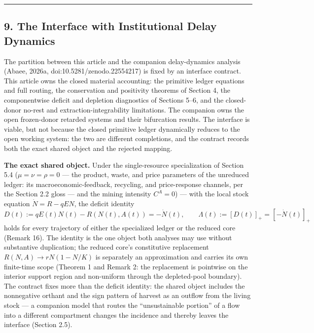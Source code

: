 \documentclass[11pt]{article}
\begin{document}
\begin{center}\rule{0.5\linewidth}{0.5pt}\end{center}

\subsection{9. The Interface with Institutional Delay
Dynamics}\label{the-interface-with-institutional-delay-dynamics}

The partition between this article and the companion delay-dynamics analysis (Abaee, 2026a, doi:10.5281/\allowbreak{}zenodo.22554217) is fixed by an interface contract. This article owns the closed material accounting: the
primitive ledger equations and full routing, the conservation and
positivity theorems of Section 4, the componentwise deficit and
depletion diagnostics of Sections 5--6, and the closed-donor no-rest and
extraction-integrability limitations. The companion owns the open
frozen-donor retarded systems and their bifurcation results. The
interface is viable, but not because the closed primitive ledger
dynamically reduces to the open working system: the two are different
completions, and the contract records both the exact shared object and
the rejected mapping.

\textbf{The exact shared object.} Under the single-resource
specialization of Section 5.4 (\(\mu = \nu = \rho = 0\) --- the product,
waste, and price parameters of the unreduced ledger: its
macroeconomic-feedback, recycling, and price-response channels, per the
Section 2.2 gloss --- and the mining intensity \(C^A = 0\)) --- with the
local stock equation \(\dot N = R - qEN\), the deficit identity
\[D(t) := qE(t)N(t) - R(N(t), A(t)) = -\dot N(t), \qquad \Lambda(t) := [D(t)]_+ = [-\dot N(t)]_+\]
holds for every trajectory of either the specialized ledger or the
reduced core (Remark 16). The identity is the one object both analyses
may use without substantive duplication; the reduced core's constitutive
replacement \(R(N,A) \to rN(1 - N/\allowbreak{}K)\) is separately an approximation
and carries its own finite-time scope (Theorem 1 and Remark 2: the
replacement is pointwise on the interior support region and non-uniform
through the depleted-pool boundary). The contract fixes more than the
deficit identity: the shared object includes the nonnegative orthant and
the sign pattern of harvest as an outflow from the living stock --- a
companion model that routes the ``unsustainable portion'' of a flow into
a different compartment changes the incidence and thereby leaves the
interface (Section 2.5).
\end{document}
